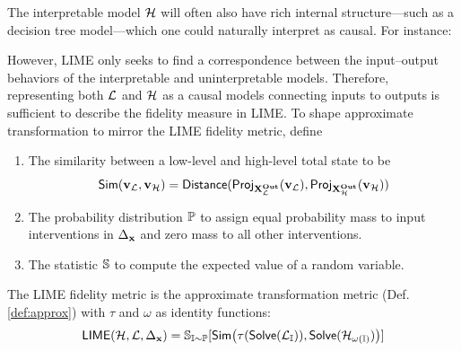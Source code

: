 \documentclass[twoside,11pt]{article}
\begin{document}
The interpretable model $\mathcal{H}$ will often also have rich internal structure---such as a decision tree model---which one could naturally interpret as causal. For instance: 

     \centerline{}


However, LIME only seeks to find a correspondence between the input--output behaviors of the interpretable and uninterpretable models. Therefore, representing both $\mathcal{L}$ and $\mathcal{H}$ as a causal models connecting inputs to outputs is sufficient to describe the fidelity measure in LIME.
To shape approximate transformation to mirror the LIME fidelity metric, define 
\begin{enumerate}
    \item  The similarity between a low-level and high-level total state to be \[\mathsf{Sim}(\mathbf{v}_{\mathcal{L}}, \mathbf{v}_{\mathcal{H}}) = \mathsf{Distance}(\mathsf{Proj}_{\mathbf{X}^{\mathbf{Out}}_{\mathcal{L}}}(\mathbf{v}_{\mathcal{L}}), \mathsf{Proj}_{\mathbf{X}^{\mathbf{Out}}_{\mathcal{H}}}(\mathbf{v}_{\mathcal{H}}))\]
 \item The probability distribution $\mathbb{P}$ to assign equal probability mass to input interventions in $\Delta_{\mathbf{x}}$ and zero mass to all other interventions. 
 \item The statistic $\mathbb{S}$ to compute the expected value of a random variable. 
\end{enumerate}
 The LIME fidelity metric is the approximate transformation metric (Def. \ref{def:approx}) with $\tau$ and $\omega$ as identity functions:
\[\mathsf{LIME}(\mathcal{H},\mathcal{L}, \Delta_{\mathbf{x}}) = 
 \mathbb{S}_{\mathbb{I}\sim \mathbb{P}}[\mathsf{Sim}\big( \tau(\mathsf{Solve}(\mathcal{L}_{\mathbb{I}}) ), \mathsf{Solve}(\mathcal{H}_{\omega(\mathbb{I})} )\big) ]\]
 
\end{document}
